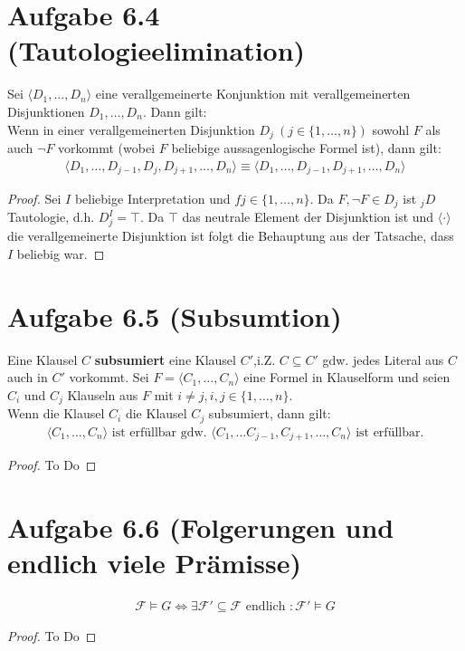 \documentclass[12pt,a4paper]{article}
\newcommand{\F}{\mathcal{F}}
\begin{document}
\section*{Aufgabe 6.4 (Tautologieelimination)}
Sei $\langle D_1,\ldots,D_n\rangle$ eine verallgemeinerte Konjunktion mit verallgemeinerten Disjunktionen $D_1,\ldots,D_n$. Dann gilt:\\
Wenn in einer verallgemeinerten Disjunktion $D_j~(j\in\lbrace1,\ldots,n\rbrace)$ sowohl $F$ als auch $\neg F$ vorkommt (wobei $F$ beliebige aussagenlogische Formel ist), dann gilt:
\begin{align*}
\big\langle D_1,\ldots,D_{j-1},D_j,D_{j+1},\ldots, D_n\big\rangle\equiv\big\langle D_1,\ldots,D_{j-1},D_{j+1},\ldots,D_n\big\rangle
\end{align*}
\begin{proof}
Sei $I$ beliebige Interpretation und $fj\in\lbrace1,\ldots,n\rbrace$. Da $F,\neg F\in D_j$ ist $_jD$ Tautologie, d.h. $D_j^I=\top$. Da $\top$ das neutrale Element der Disjunktion ist und $\langle\cdot\rangle$ die verallgemeinerte Disjunktion ist folgt die Behauptung aus der Tatsache, dass $I$ beliebig war.
\end{proof}

\section*{Aufgabe 6.5 (Subsumtion)}
Eine Klausel $C$ \textbf{subsumiert} eine Klausel $C'$,i.Z. $C\subseteq C'$ gdw. jedes Literal aus $C$ auch in $C'$ vorkommt.\nl
Sei $F=\langle C_1,\ldots,C_n\rangle$ eine Formel in Klauselform und seien $C_i$ und  $C_j$ Klauseln aus $F$ mit $i\neq j,i,j\in\lbrace1,\ldots,n\rbrace$.\\
Wenn die Klausel $C_i$ die Klausel $C_j$ subsumiert, dann gilt:
\begin{align*}
\big\langle C_1,\ldots,C_n\big\rangle\text{ ist erfüllbar gdw. }\big\langle C_1,\ldots C_{j-1},C_{j+1},\ldots,C_n\big\rangle\text{ ist erfüllbar.}
\end{align*}
\begin{proof}
To Do
\end{proof}

\section*{Aufgabe 6.6 (Folgerungen und endlich viele Prämisse)}
\begin{align*}
\F\models G\Longleftrightarrow \exists\F'\subseteq\F\text{ endlich }:\F'\models G
\end{align*}
\begin{proof}
To Do
\end{proof}
\end{document}
